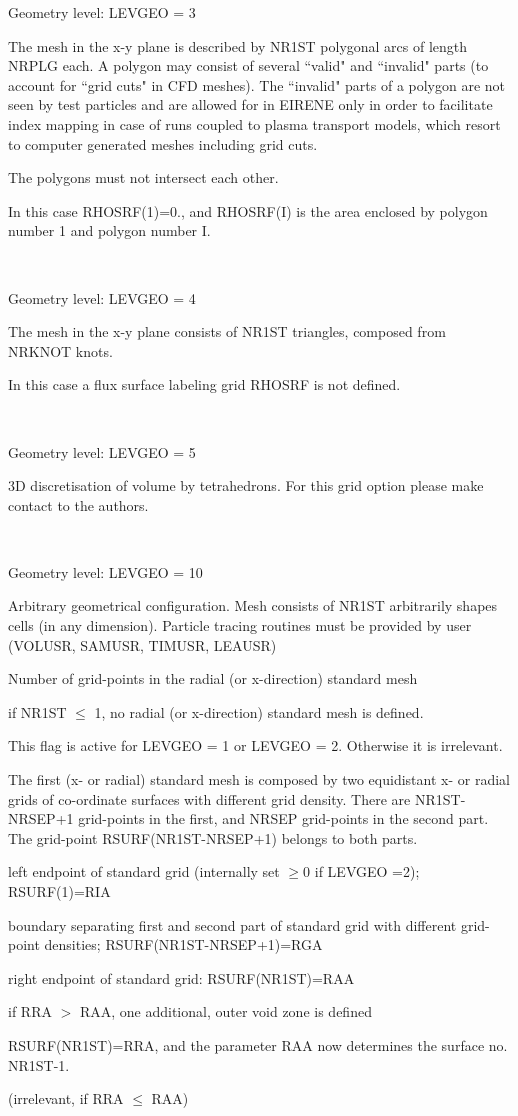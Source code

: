 \begin{list}{ }{}
Geometry level: LEVGEO = 3

The mesh in the x-y plane
is described by NR1ST polygonal arcs of length NRPLG
each. A polygon
may consist of several ``valid" and ``invalid"
parts (to account for ``grid cuts" in CFD meshes).
The ``invalid" parts of a polygon are not seen by test particles and are
allowed for in EIRENE only in order to facilitate index mapping
in case of runs coupled to plasma transport models,
which resort to computer
generated meshes including grid cuts.

The polygons must not intersect each other.

In this case RHOSRF(1)=0., and RHOSRF(I) is the area enclosed by
polygon number 1 and polygon number I.
\item[{\bf NLFEM = .TRUE. }] ~

Geometry level: LEVGEO = 4

The mesh in the x-y plane
consists of NR1ST triangles, composed from NRKNOT knots.

In this case a flux surface labeling grid RHOSRF is not defined.
\item[{\bf NLTET = .TRUE. }] ~

Geometry level: LEVGEO = 5

3D discretisation of volume by tetrahedrons. For this grid option
please make contact to the authors.
\item[{\bf NLGEN = .TRUE. }] ~

Geometry level: LEVGEO = 10

Arbitrary geometrical configuration. Mesh consists of NR1ST arbitrarily
shapes cells (in any dimension).
Particle tracing routines
must be provided by user (VOLUSR, SAMUSR, TIMUSR, LEAUSR)
\medskip
\item[{\bf NR1ST }]
Number of grid-points in the radial (or x-direction) standard mesh

if NR1ST $\le$ 1, no radial (or x-direction)
standard mesh is defined.
\item[{\bf NRSEP }]
This flag is active for LEVGEO = 1 or LEVGEO = 2. Otherwise it is irrelevant.

The first (x- or radial) standard mesh is composed by two equidistant x- or radial grids
of co-ordinate surfaces with different grid density.
There are NR1ST-NRSEP+1 grid-points in the first, and NRSEP
grid-points in the second part. The grid-point RSURF(NR1ST-NRSEP+1)
belongs to both parts.
\item[{\bf RIA }]
left endpoint of standard grid (internally set $\ge 0$ if LEVGEO =2);
RSURF(1)=RIA
\item[{\bf RGA }]
boundary separating first and second part of standard grid with
different grid-point densities; RSURF(NR1ST-NRSEP+1)=RGA
\item[{\bf RAA }]
right endpoint of standard grid: RSURF(NR1ST)=RAA
\item[{\bf RRA }]
if RRA $>$ RAA, one additional, outer void zone is defined

RSURF(NR1ST)=RRA, and the parameter RAA now determines the surface no. NR1ST-1.

(irrelevant, if RRA $\le$ RAA)
\end{list}

